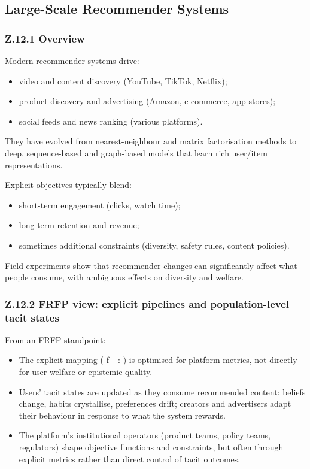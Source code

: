 \subsection{Large-Scale Recommender Systems}

\subsubsection*{Z.12.1 Overview}

Modern recommender systems drive:

\begin{itemize}
\item video and content discovery (YouTube, TikTok, Netflix);
\item product discovery and advertising (Amazon, e-commerce, app stores);
\item social feeds and news ranking (various platforms).
\end{itemize}

They have evolved from nearest-neighbour and matrix factorisation methods to
deep, sequence-based and graph-based models that learn rich user/item
representations.

Explicit objectives typically blend:

\begin{itemize}
\item short-term engagement (clicks, watch time);
\item long-term retention and revenue;
\item sometimes additional constraints (diversity, safety rules,
content policies).
\end{itemize}

Field experiments show that recommender changes can significantly affect
what people consume, with ambiguous effects on diversity and welfare.

\subsubsection*{Z.12.2 FRFP view: explicit pipelines and population-level tacit states}

From an FRFP standpoint:

\begin{itemize}
\item The explicit mapping
(
f_{} :  \to {}
)
is optimised for platform metrics, not directly for user welfare or
epistemic quality.
\item Users’ tacit states are updated as they consume recommended content:
beliefs change, habits crystallise, preferences drift; creators and
advertisers adapt their behaviour in response to what the system
rewards.
\item The platform’s institutional operators (product teams, policy
teams, regulators) shape objective functions and constraints, but
often through explicit metrics rather than direct control of tacit
outcomes.
\end{itemize}

